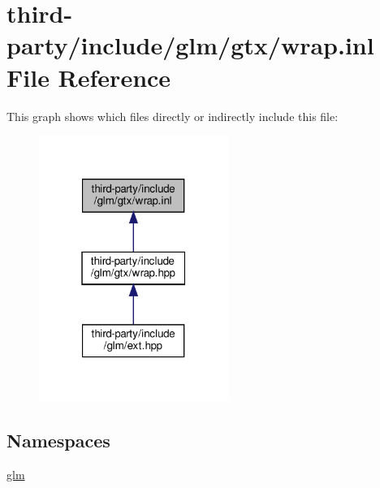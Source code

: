 \hypertarget{wrap_8inl}{}\section{third-\/party/include/glm/gtx/wrap.inl File Reference}
\label{wrap_8inl}
This graph shows which files directly or indirectly include this file\+:
\nopagebreak
\begin{figure}[H]
\begin{center}
\leavevmode
\includegraphics[width=175pt]{wrap_8inl__dep__incl}
\end{center}
\end{figure}
\subsection*{Namespaces}
\begin{DoxyCompactItemize}
\item 
 \hyperlink{namespaceglm}{glm}
\end{DoxyCompactItemize}
